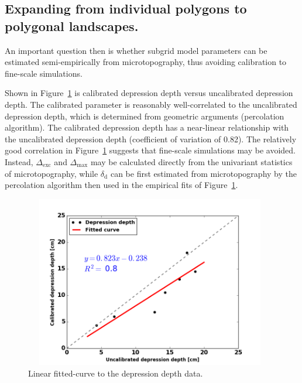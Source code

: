 \documentclass[review,11pt]{elsarticle}
\begin{document}
\subsection{Expanding from individual polygons to polygonal landscapes.}
%
An important question then is whether subgrid model parameters can be estimated semi-empirically from microtopography, thus avoiding calibration to fine-scale simulations.

Shown in Figure~\ref{curvefit-dd-manning} is calibrated depression depth versus uncalibrated depression depth.
The calibrated parameter is reasonably well-correlated to the uncalibrated depression depth, which is determined from geometric arguments (percolation algorithm).
The calibrated depression depth has a near-linear relationship with the uncalibrated depression depth (coefficient of variation of 0.82). 
The relatively good correlation in Figure~\ref{curvefit-dd-manning} suggests that fine-scale simulations may be avoided.
Instead, $\Delta_\text{exc}$ and $\Delta_\text{max}$ may be calculated directly from the univariant statistics of microtopography, while $\delta_\text{d}$ can be first estimated from microtopography by the percolation algorithm then used in the empirical fits of Figure~\ref{curvefit-dd-manning}.
%
\begin{figure}[!h]
\centering
\includegraphics[width=11cm, height=7.5cm]{./figures/fittedcurve-dd-1.png}
\caption{Linear fitted-curve to the depression depth data.}
\label{curvefit-dd-manning}
\end{figure}
%
\end{document}
